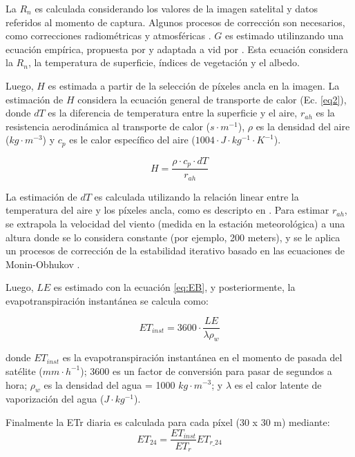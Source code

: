 \documentclass[]{article}
\begin{document}
La $R_n$ es calculada considerando los valores de la imagen satelital y datos referidos al momento de captura. Algunos procesos de corrección son necesarios, como correcciones radiométricas y atmosféricas \citep{Tasumi2008a}. $G$ es estimado utilinzando una ecuación empírica, propuesta por \cite{Allen2007a} y adaptada a vid por \cite{Carrasco-Benavides2014}. Esta ecuación considera la $R_n$, la temperatura de superficie, índices de vegetación y el albedo. 

Luego, $H$ es estimada a partir de la selección de píxeles ancla en la imagen. La estimación de $H$ considera la ecuación general de transporte de calor (Ec. \ref{eq2}), donde $dT$ es  la diferencia de temperatura entre la superficie y el aire, $r_{ah}$ es la resistencia aerodinámica al transporte de calor ($s \cdot m^{-1}$), $\rho$ es la densidad del aire ($kg \cdot m^{-3}$) y $c_{p}$ es le calor específico del aire ($1004\cdot J \cdot kg^{-1} \cdot K^{-1}$). 

\begin{equation}
\label{eq2}
H=\frac{\rho \cdot c_{p} \cdot dT}{r_{ah}} 
\end{equation}

La estimación de $dT$ es calculada utilizando la relación linear entre la temperatura del aire y  los píxeles ancla, como es descripto en  \cite{Bastiaanssen1998a}. Para estimar $r_{ah}$, se extrapola la velocidad del viento (medida en la estación meteorológica) a una altura donde se lo considera constante (por ejemplo, 200 meters), y se le aplica un procesos de corrección de la estabilidad iterativo basado en las ecuaciones de Monin-Obhukov \cite{Allen1996}.

Luego, $LE$ es estimado con la ecuación \ref{eq:EB}, y posteriormente, la evapotranspiración instantánea se calcula como:

\begin{equation}
ET_{inst} = 3600 \cdot \frac{LE}{\lambda \rho_w}
\end{equation}

donde $ET_{inst}$ es la evapotranspiración instantánea en el momento de pasada del satélite ($mm \cdot h^{-1}$); 3600 es un factor de conversión para pasar de segundos a hora; $\rho_w$ es la densidad del agua = 1000 $kg\cdot m^{-3}$; y $\lambda$ es el calor latente de vaporización del agua ($J\cdot kg^{-1}$).

Finalmente la ETr diaria es calculada para cada píxel (30 x 30 m) mediante:
\begin{equation}
ET_{24} = \frac{ET_{inst}}{ET_r} ET_{r\_24}
\label{eq:et24}
\end{equation}
\end{document}
